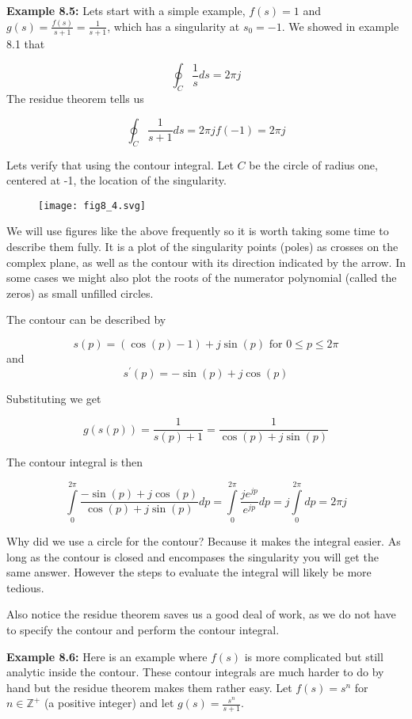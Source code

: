 \documentclass{article}
\begin{document}
\textbf{Example 8.5:} Lets start with a simple example, $f(s) = 1$ and $g(s) = \frac{f(s)}{s+1} = \frac{1}{s+1}$, which has a singularity at $s_0 = -1$. We showed in example 8.1 that

\[
\oint_C \frac{1}{s} ds = 2\pi j 
\]
The residue theorem tells us

\[
\oint_C \frac{1}{s+1} ds = 2\pi j f(-1) = 2\pi j 
\]

Lets verify that using the contour integral. Let $C$ be the circle of radius one, centered at -1, the location of the singularity.

\begin{figure}
  \centering
  \texttt{[image: fig8\_4.svg]}
\end{figure}

We will use figures like the above frequently so it is worth taking some time to describe them fully. It is a plot of the singularity points (poles) as crosses on the complex plane, as well as the contour with its direction indicated by the arrow. In some cases we might also plot the roots of the numerator polynomial (called the zeros) as small unfilled circles.

The contour can be described by

\[
s(p) = (\cos(p) - 1) + j\sin(p) \text{ for } 0 \leq p \leq 2\pi
\]
and
\[
s^\prime(p) = -\sin(p) + j\cos(p)
\]

Substituting we get

\[
g(s(p)) = \frac{1}{s(p) + 1} = \frac{1}{\cos(p) + j\sin(p)}
\]

The contour integral is then

\[
\int\limits_{0}^{2\pi} \frac{-\sin(p) + j\cos(p)}{\cos(p) + j\sin(p)} dp = \int\limits_{0}^{2\pi} \frac{je^{jp}}{e^{jp}} dp = j \int\limits_{0}^{2\pi} dp = 2\pi j 
\]

Why did we use a circle for the contour? Because it makes the integral easier. As long as the contour is closed and encompases the singularity you will get the same answer. However the steps to evaluate the integral will likely be more tedious.

Also notice the residue theorem saves us a good deal of work, as we do not have to specify the contour and perform the contour integral.

\textbf{Example 8.6:} Here is an example where $f(s)$ is more complicated but still analytic inside the contour. These contour integrals are much harder to do by hand but the residue theorem makes them rather easy. Let $f(s) = s^n$ for $n\in\mathbb{Z}^+$ (a positive integer) and let $g(s) = \frac{s^n}{s+1}$.
\end{document}
